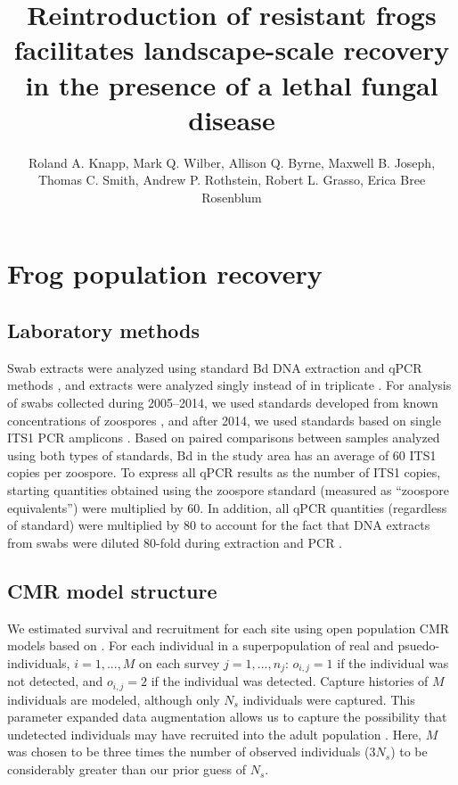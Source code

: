 \documentclass[9pt,twoside,lineno]{pnas-new-SI}
\title{Reintroduction of resistant frogs facilitates landscape-scale recovery in the presence of a lethal fungal disease}
\author{Roland A. Knapp, Mark Q. Wilber, Allison Q. Byrne, Maxwell B. Joseph, Thomas C. Smith, Andrew P. Rothstein, Robert L. Grasso, Erica Bree Rosenblum}
\begin{document}
\maketitle

\SItext
\hypertarget{frog-population-recovery-2}{%
\section{Frog population
recovery}\label{frog-population-recovery-2}}

\hypertarget{laboratory-methods}{%
\subsection{Laboratory methods}\label{laboratory-methods}}

Swab extracts were analyzed using standard Bd DNA extraction and qPCR
methods \citep{boyle2004}, and extracts were analyzed singly instead of
in triplicate \citep{kriger2006}. For analysis of swabs collected during
2005--2014, we used standards developed from known concentrations of
zoospores \citep{boyle2004}, and after 2014, we used standards based on
single ITS1 PCR amplicons \citep{longo2013}. Based on paired comparisons
between samples analyzed using both types of standards, Bd in the study
area has an average of 60 ITS1 copies per zoospore. To express all qPCR
results as the number of ITS1 copies, starting quantities obtained using
the zoospore standard (measured as ``zoospore equivalents'') were
multiplied by 60. In addition, all qPCR quantities (regardless of
standard) were multiplied by 80 to account for the fact that DNA
extracts from swabs were diluted 80-fold during extraction and PCR
\citep{vredenburg2010}.

\hypertarget{cmr-model-structure}{%
\subsection{CMR model structure}\label{cmr-model-structure}}

We estimated survival and recruitment for each site using open
population CMR models based on \citep{joseph2018}. For each individual
in a superpopulation of real and psuedo-individuals, \(i=1, ..., M\) on
each survey \(j=1, ..., n_j\): \(o_{i, j} = 1\) if the individual was
not detected, and \(o_{i, j}=2\) if the individual was detected. Capture
histories of \(M\) individuals are modeled, although only \(N_s\)
individuals were captured. This parameter expanded data augmentation
allows us to capture the possibility that undetected individuals may
have recruited into the adult population \citep{royle2012}. Here, \(M\)
was chosen to be three times the number of observed individuals
(\(3N_s\)) to be considerably greater than our prior guess of \(N_s\).
\end{document}
